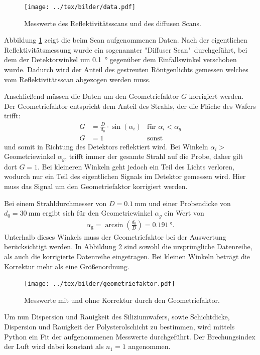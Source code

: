 \begin{figure}[h]
	\centering
	\texttt{[image: ../tex/bilder/data.pdf]}
	\caption{Messwerte des Reflektivitätsscans und des diffusen Scans.}
	\label{pic:daten}
\end{figure}

Abbildung \ref{pic:daten} zeigt die beim Scan aufgenommenen Daten. Nach der eigentlichen Reflektivitätsmessung wurde ein sogenannter "Diffuser Scan"\ durchgeführt, bei dem der Detektorwinkel um \SI{0.1}{\degree} gegenüber dem Einfallswinkel verschoben wurde. Dadurch wird der Anteil des gestreuten Röntgenlichts gemessen welches vom Reflektivitätsscan abgezogen werden muss.

Anschließend müssen die Daten um den Geometriefaktor $G$ korrigiert werden.
Der Geometriefaktor entspricht dem Anteil des Strahls, der die Fläche des Wafers trifft:
\begin{align}
	G &= \frac{D}{d_0}\cdot \sin(\alpha_i) &\text{für $\alpha_i < \alpha_g$}\\
	G &= 1 &\text{sonst}
\end{align}
 und somit in Richtung des Detektors reflektiert wird. Bei Winkeln $\alpha_i >$ Geometriewinkel $\alpha_g$, trifft immer der gesamte Strahl auf die Probe, daher gilt dort $G=1$. Bei kleineren Winkeln geht jedoch ein Teil des Lichts verloren, wodurch nur ein Teil des eigentlichen Signals im Detektor gemessen wird. Hier muss das Signal um den Geometriefaktor korrigiert werden.

Bei einem Strahldurchmesser von $D = \SI{0.1}{\milli\meter}$ und einer Probendicke von $d_0 = \SI{30}{\milli\meter}$ ergibt sich für den Geometriewinkel $\alpha_g$ ein Wert von
\begin{align}
	\alpha_\text{g} = \arcsin\left(\frac{d_0}{D}\right) = \SI{0.191}{\degree}.
\end{align}
Unterhalb dieses Winkels muss der Geometriefaktor bei der Auswertung berücksichtigt werden. In Abbildung \ref{pic:geometrie} sind sowohl die ursprüngliche Datenreihe, als auch die korrigierte Datenreihe eingetragen. Bei kleinen Winkeln beträgt die Korrektur mehr als eine Größenordnung.

\begin{figure}[h]
	\centering
	\texttt{[image: ../tex/bilder/geometriefaktor.pdf]}
	\caption{Messwerte mit und ohne Korrektur durch den Geometriefaktor.}
	\label{pic:geometrie}
\end{figure}


Um nun Dispersion und Rauigkeit des Siliziumwafers, sowie Schichtdicke, Dispersion und Rauigkeit der Polysterolschicht zu bestimmen, wird mittels Python ein Fit der aufgenommenen Messwerte durchgeführt. Der Brechungsindex der Luft wird dabei konstant als $n_1=1$ angenommen.

